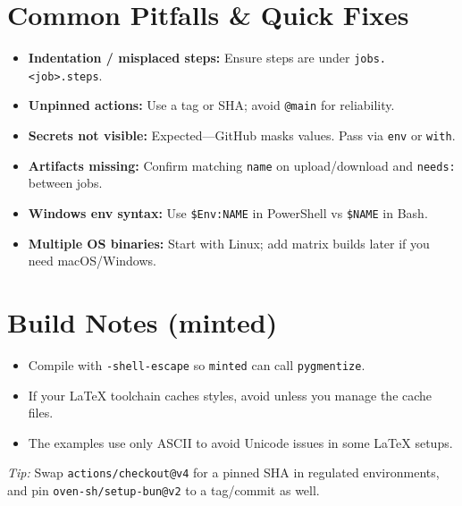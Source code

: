 \documentclass[11pt]{article}
\begin{document}
\section{Common Pitfalls \& Quick Fixes}
\begin{itemize}
  \item \textbf{Indentation / misplaced steps:} Ensure steps are under \texttt{jobs.<job>.steps}.
  \item \textbf{Unpinned actions:} Use a tag or SHA; avoid \texttt{@main} for reliability.
  \item \textbf{Secrets not visible:} Expected---GitHub masks values. Pass via \texttt{env} or \texttt{with}.
  \item \textbf{Artifacts missing:} Confirm matching \texttt{name} on upload/download and \texttt{needs:} between jobs.
  \item \textbf{Windows env syntax:} Use \texttt{\$Env:NAME} in PowerShell vs \texttt{\$NAME} in Bash.
  \item \textbf{Multiple OS binaries:} Start with Linux; add matrix builds later if you need macOS/Windows.
\end{itemize}

\section{Build Notes (minted)}
\begin{itemize}
  \item Compile with \texttt{-shell-escape} so \texttt{minted} can call \texttt{pygmentize}.
  \item If your LaTeX toolchain caches styles, avoid \texttt{} unless you manage the cache files.
  \item The examples use only ASCII to avoid Unicode issues in some LaTeX setups.
\end{itemize}

\vfill
\noindent\textit{Tip:} Swap \texttt{actions/checkout@v4} for a pinned SHA in regulated environments, and pin \texttt{oven-sh/setup-bun@v2} to a tag/commit as well.
\end{document}
